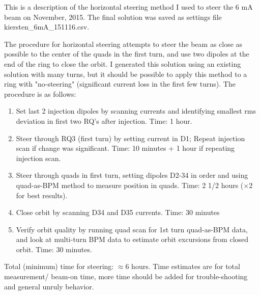 This is a description of the horizontal steering method I used to steer the 6 mA beam on November, 2015. The final solution was saved as settings file kiersten\_6mA\_151116.csv.

The procedure for horizontal steering attempts to steer the beam as close as possible to the center of the quads in the first turn, and use two dipoles at the end of the ring to close the orbit. I generated this solution using an existing solution with many turns, but it should be possible to apply this method to a ring with "no-steering" (significant current loss in the first few turns).
The procedure is as follows:

\begin{enumerate}
\item Set last 2 injection dipoles by scanning currents and identifying smallest rms deviation in first two RQ's after injection. Time: 1 hour.
\item Steer through RQ3 (first turn) by setting current in D1; Repeat injection scan if change was significant. Time: 10 minutes + 1 hour if repeating injection scan.
\item Steer through quads in first turn, setting dipoles D2-34 in order and using quad-as-BPM method to measure position in quads. Time: 2 1/2 hours ($\times 2$ for best results).
\item Close orbit by scanning D34 and D35 currents.  Time: 30 minutes
\item Verify orbit quality by running quad scan for 1st turn quad-as-BPM data, and look at multi-turn BPM data to estimate orbit excursions from closed orbit. Time: 30 minutes.
\end{enumerate}

 Total (minimum) time for steering: $\approx 6$ hours. Time estimates are for total measurement/ beam-on time, more time should be added for trouble-shooting and general unruly behavior.






